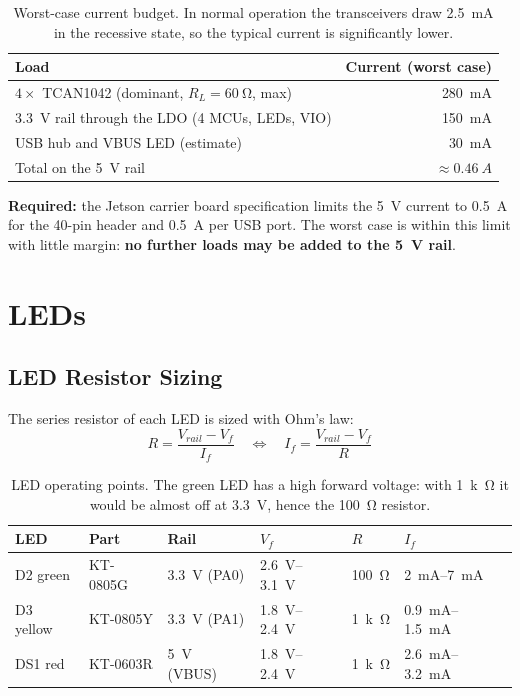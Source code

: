 \documentclass[11pt,a4paper]{article}
\newcommand{\required}[1]{\begin{reqbox}\textbf{\color{reqred}Required:} #1\end{reqbox}}
\begin{document}
\begin{table}[H]
\centering
\begin{tabular}{lr}
\toprule
Load & Current (worst case) \\
\midrule
$4\times$ TCAN1042 (dominant, $R_L = \qty{60}{\ohm}$, max) & \qty{280}{mA} \\
\qty{3.3}{V} rail through the LDO (4 MCUs, LEDs, VIO) & \qty{150}{mA} \\
USB hub and VBUS LED (estimate) & \qty{30}{mA} \\
\midrule
Total on the \qty{5}{V} rail & $\approx\qty{0.46}{A}$ \\
\bottomrule
\end{tabular}
\caption{Worst-case current budget. In normal operation the transceivers draw \qty{2.5}{mA} in the
recessive state, so the typical current is significantly lower.}
\label{tab:budget}
\end{table}

\required{the Jetson carrier board specification limits the \qty{5}{V} current to \qty{0.5}{A} for the 40-pin
header and \qty{0.5}{A} per USB port. The worst case is within this limit with little margin:
\textbf{no further loads may be added to the \qty{5}{V} rail}.}

\section{LEDs}

\subsection{LED Resistor Sizing}

The series resistor of each LED is sized with Ohm's law:
\begin{equation}
R = \frac{V_{rail} - V_f}{I_f} \quad\iff\quad I_f = \frac{V_{rail} - V_f}{R}
\end{equation}

\begin{table}[H]
\centering
\begin{tabular}{llllll}
\toprule
LED & Part & Rail & $V_f$ & $R$ & $I_f$ \\
\midrule
D2 green  & KT-0805G & \qty{3.3}{V} (PA0) & \qtyrange{2.6}{3.1}{V} & \qty{100}{\ohm} & \qtyrange{2}{7}{mA} \\
D3 yellow & KT-0805Y & \qty{3.3}{V} (PA1) & \qtyrange{1.8}{2.4}{V} & \qty{1}{k\ohm} & \qtyrange{0.9}{1.5}{mA} \\
DS1 red   & KT-0603R & \qty{5}{V} (VBUS)  & \qtyrange{1.8}{2.4}{V} & \qty{1}{k\ohm} & \qtyrange{2.6}{3.2}{mA} \\
\bottomrule
\end{tabular}
\caption{LED operating points. The green LED has a high forward voltage: with \qty{1}{k\ohm} it would
be almost off at \qty{3.3}{V}, hence the \qty{100}{\ohm} resistor.}
\label{tab:leds}
\end{table}
\end{document}
